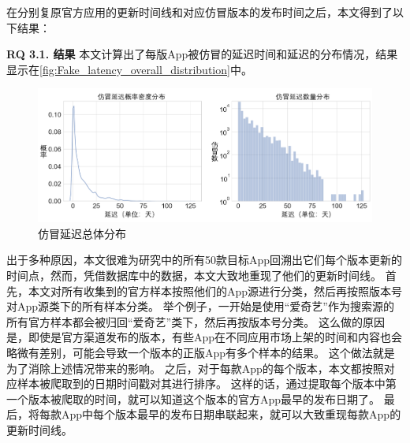 在分别复原官方应用的更新时间线和对应仿冒版本的发布时间之后，本文得到了以下结果：

{\bf RQ 3.1. 结果}
本文计算出了每版App被仿冒的延迟时间和延迟的分布情况，结果显示在\autoref{fig:Fake_latency_overall_distribution}中。

\begin{figure}
	\centering
	\includegraphics[width=\textwidth]{./Figures/edwin-Fake_latency_overall_distribution2.png}
	\caption{仿冒延迟总体分布}
	\label{fig:Fake_latency_overall_distribution}
\end{figure}

出于多种原因，本文很难为研究中的所有50款目标App回溯出它们每个版本更新的时间点，然而，凭借数据库中的数据，本文大致地重现了他们的更新时间线。
首先，本文对所有收集到的官方样本按照他们的App源进行分类，然后再按照版本号对App源类下的所有样本分类。
举个例子，一开始是使用``爱奇艺''作为搜索源的所有官方样本都会被归回``爱奇艺''类下，然后再按版本号分类。
这么做的原因是，即使是官方渠道发布的版本，有些App在不同应用市场上架的时间和内容也会略微有差别，可能会导致一个版本的正版App有多个样本的结果。
这个做法就是为了消除上述情况带来的影响。
之后，对于每款App的每个版本，本文都按照对应样本被爬取到的日期时间戳对其进行排序。
这样的话，通过提取每个版本中第一个版本被爬取的时间，就可以知道这个版本的官方App最早的发布日期了。
最后，将每款App中每个版本最早的发布日期串联起来，就可以大致重现每款App的更新时间线。

